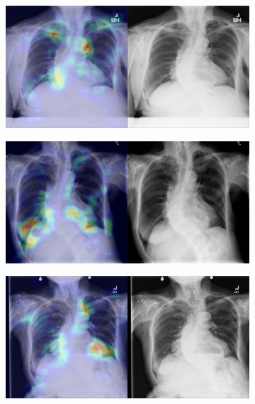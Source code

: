 \begin{figure}[b]
    \centering
    \begin{subfigure}{0.4\textwidth}
        \centering
        \includegraphics[width=1.0\textwidth]{Chapters/5. Conclusiones/img/Hernia/1_1_00000284_001.png}
    \end{subfigure}
    \begin{subfigure}{0.4\textwidth}
        \centering
        \includegraphics[width=1.0\textwidth]{Chapters/5. Conclusiones/img/Hernia/1_1_00000284_003.png}
    \end{subfigure}
    \begin{subfigure}{0.4\textwidth}
        \centering
        \includegraphics[width=1.0\textwidth]{Chapters/5. Conclusiones/img/Hernia/1_1_00000284_005.png}

\end{subfigure}
\end{figure}
